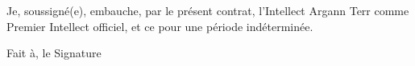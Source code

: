 \documentclass[14pt]{extarticle}
\begin{document}
\begin{framed}
    Je, soussigné(e)\hspace{7cm}, embauche, par le présent contrat, l'Intellect
    Argann Terr comme Premier Intellect officiel, et ce pour une période
    indéterminée.

    \vspace{7cm}

    \noindent
    Fait à\hspace{4cm}, le \hfill Signature

    \vspace{3cm}

\end{framed}
\end{document}
